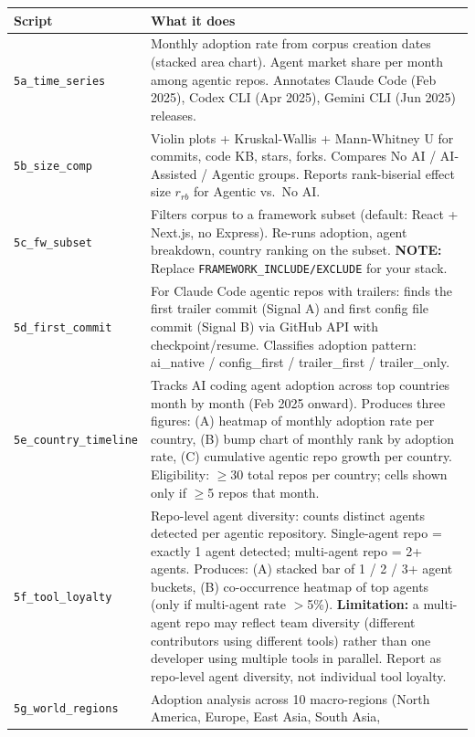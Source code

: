 \documentclass[9pt,a4paper]{article}
\begin{document}
\begin{tabular}{@{}lp{14cm}@{}}
\toprule
Script & What it does \\
\midrule
\cellcolor{stagegray}\texttt{5a\_time\_series} &
  Monthly adoption rate from corpus creation dates (stacked area chart).
  Agent market share per month among agentic repos.
  Annotates Claude Code (Feb 2025), Codex CLI (Apr 2025), Gemini CLI (Jun 2025) releases. \\[2pt]
\cellcolor{stagegray}\texttt{5b\_size\_comp} &
  Violin plots + Kruskal-Wallis + Mann-Whitney U for commits, code KB, stars, forks.
  Compares No AI / AI-Assisted / Agentic groups.
  Reports rank-biserial effect size $r_{rb}$ for Agentic vs.\ No AI. \\[2pt]
\cellcolor{stagegray}\texttt{5c\_fw\_subset} &
  Filters corpus to a framework subset (default: React + Next.js, no Express).
  Re-runs adoption, agent breakdown, country ranking on the subset.
  \textbf{NOTE:} Replace \texttt{FRAMEWORK\_INCLUDE/EXCLUDE} for your stack. \\[2pt]
\cellcolor{stagegray}\texttt{5d\_first\_commit} &
  For Claude Code agentic repos with trailers: finds the first trailer commit (Signal A)
  and first config file commit (Signal B) via GitHub API with checkpoint/resume.
  Classifies adoption pattern: ai\_native / config\_first / trailer\_first / trailer\_only. \\[2pt]
\cellcolor{stagegray}\texttt{5e\_country\_timeline} &
  Tracks AI coding agent adoption across top countries month by month (Feb 2025 onward).
  Produces three figures: (A) heatmap of monthly adoption rate per country, (B) bump chart
  of monthly rank by adoption rate, (C) cumulative agentic repo growth per country.
  Eligibility: $\geq$30 total repos per country; cells shown only if $\geq$5 repos that month. \\[2pt]
\cellcolor{stagegray}\texttt{5f\_tool\_loyalty} &
  Repo-level agent diversity: counts distinct agents detected per agentic repository.
  Single-agent repo = exactly 1 agent detected; multi-agent repo = 2+ agents.
  Produces: (A) stacked bar of 1 / 2 / 3+ agent buckets, (B) co-occurrence heatmap of top
  agents (only if multi-agent rate $>$5\%).
  \textbf{Limitation:} a multi-agent repo may reflect team diversity (different contributors
  using different tools) rather than one developer using multiple tools in parallel.
  Report as repo-level agent diversity, not individual tool loyalty. \\[2pt]
\cellcolor{stagegray}\texttt{5g\_world\_regions} &
  Adoption analysis across 10 macro-regions (North America, Europe, East Asia, South Asia,

\end{tabular}
\end{document}
